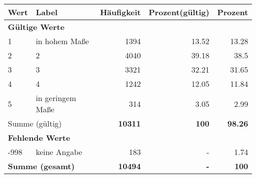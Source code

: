      \begin{longtable}{lXrrr}
     \toprule
     \textbf{Wert} & \textbf{Label} & \textbf{Häufigkeit} & \textbf{Prozent(gültig)} & \textbf{Prozent} \\
     \endhead
     \midrule
     \multicolumn{5}{l}{\textbf{Gültige Werte}}\\

     1 &
     \multicolumn{1}{X}{ in hohem Maße   } &


       \num{1394} &
       \num[round-mode=places,round-precision=2]{13.52} &
         \num[round-mode=places,round-precision=2]{13.28} \\

     2 &
     \multicolumn{1}{X}{ 2   } &


       \num{4040} &
       \num[round-mode=places,round-precision=2]{39.18} &
         \num[round-mode=places,round-precision=2]{38.5} \\

     3 &
     \multicolumn{1}{X}{ 3   } &


       \num{3321} &
       \num[round-mode=places,round-precision=2]{32.21} &
         \num[round-mode=places,round-precision=2]{31.65} \\

     4 &
     \multicolumn{1}{X}{ 4   } &


       \num{1242} &
       \num[round-mode=places,round-precision=2]{12.05} &
         \num[round-mode=places,round-precision=2]{11.84} \\

     5 &
     \multicolumn{1}{X}{ in geringem Maße   } &


       \num{314} &
       \num[round-mode=places,round-precision=2]{3.05} &
         \num[round-mode=places,round-precision=2]{2.99} \\
     \midrule
     \multicolumn{2}{l}{Summe (gültig)} &
       \textbf{\num{10311}} &
     \textbf{\num{100}} &
       \textbf{\num[round-mode=places,round-precision=2]{98.26}} \\
     \multicolumn{5}{l}{\textbf{Fehlende Werte}}\\
       -998 &
       keine Angabe &
         \num{183} &
        - &
         \num[round-mode=places,round-precision=2]{1.74} \\
     \midrule
     \multicolumn{2}{l}{\textbf{Summe (gesamt)}} &
          \textbf{\num{10494}} &
        \textbf{-} &
        \textbf{\num{100}} \\
     \bottomrule
     \end{longtable}
     
